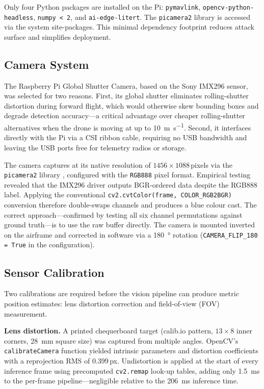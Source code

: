 Only four Python packages are installed on the Pi: \texttt{pymavlink}, \texttt{opencv-python-headless}, \texttt{numpy\,<\,2}, and \texttt{ai-edge-litert}. The \texttt{picamera2} library is accessed via the system site-packages. This minimal dependency footprint reduces attack surface and simplifies deployment.


\subsection{Camera System}\label{sec:hw-camera}

The Raspberry Pi Global Shutter Camera, based on the Sony IMX296 sensor, was selected for two reasons. First, its global shutter eliminates rolling-shutter distortion during forward flight, which would otherwise skew bounding boxes and degrade detection accuracy---a critical advantage over cheaper rolling-shutter alternatives when the drone is moving at up to \SI{10}{\metre\per\second}. Second, it interfaces directly with the Pi via a CSI ribbon cable, requiring no USB bandwidth and leaving the USB ports free for telemetry radios or storage.

The camera captures at its native resolution of $1456 \times 1088$\,pixels via the \texttt{picamera2} library \cite{picamera2}, configured with the \texttt{RGB888} pixel format. Empirical testing revealed that the IMX296 driver outputs BGR-ordered data despite the RGB888 label. Applying the conventional \texttt{cv2.cvtColor(frame, COLOR\_RGB2BGR)} conversion therefore double-swaps channels and produces a blue colour cast. The correct approach---confirmed by testing all six channel permutations against ground truth---is to use the raw buffer directly. The camera is mounted inverted on the airframe and corrected in software via a \SI{180}{\degree} rotation (\texttt{CAMERA\_FLIP\_180 = True} in the configuration).


\subsection{Sensor Calibration}\label{sec:hw-calib}

Two calibrations are required before the vision pipeline can produce metric position estimates: lens distortion correction and field-of-view (FOV) measurement.

\textbf{Lens distortion.}
A printed chequerboard target (calib.io pattern, $13 \times 8$ inner corners, \SI{28}{\milli\metre} square size) was captured from multiple angles. OpenCV's \texttt{calibrateCamera} function yielded intrinsic parameters and distortion coefficients with a reprojection RMS of 0.399\,px. Undistortion is applied at the start of every inference frame using precomputed \texttt{cv2.remap} look-up tables, adding only \SI{1.5}{\milli\second} to the per-frame pipeline---negligible relative to the \SI{206}{\milli\second} inference time.


